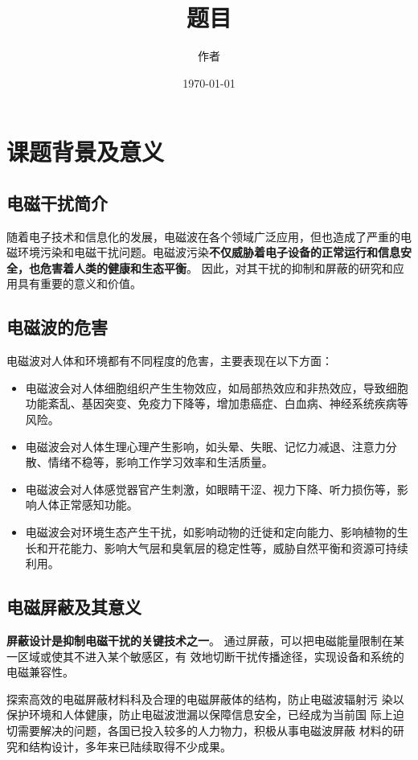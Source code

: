 \documentclass{article}
\title{题目}
\author{作者}
\date{\today}
\begin{document}
\maketitle
\newpage

\renewcommand{\baselinestretch}{1.35}
\tableofcontents
\newpage

\setlength{\parskip}{0em}
\renewcommand{\baselinestretch}{1.53}


\section{课题背景及意义}

\subsection{电磁干扰简介}
随着电子技术和信息化的发展，电磁波在各个领域广泛应用，但也造成了严重的电磁环境污染和电磁干扰问题。电磁波污染\textbf{不仅威胁着电子设备的正常运行和信息安全，也危害着人类的健康和生态平衡}。
因此，对其干扰的抑制和屏蔽的研究和应用具有重要的意义和价值。
\subsection{电磁波的危害}
电磁波对人体和环境都有不同程度的危害，主要表现在以下方面：
\begin{itemize}
\item 电磁波会对人体细胞组织产生生物效应，如局部热效应和非热效应，导致细胞功能紊乱、基因突变、免疫力下降等，增加患癌症、白血病、神经系统疾病等风险。
\item 电磁波会对人体生理心理产生影响，如头晕、失眠、记忆力减退、注意力分散、情绪不稳等，影响工作学习效率和生活质量。
\item 电磁波会对人体感觉器官产生刺激，如眼睛干涩、视力下降、听力损伤等，影响人体正常感知功能。
\item 电磁波会对环境生态产生干扰，如影响动物的迁徙和定向能力、影响植物的生长和开花能力、影响大气层和臭氧层的稳定性等，威胁自然平衡和资源可持续利用。
\end{itemize}
\subsection{电磁屏蔽及其意义}
\textbf{屏蔽设计是抑制电磁干扰的关键技术之一}。
通过屏蔽，可以把电磁能量限制在某一区域或使其不进入某个敏感区，有
效地切断干扰传播途径，实现设备和系统的电磁兼容性。

探索高效的电磁屏蔽材料科及合理的电磁屏蔽体的结构，防止电磁波辐射污
染以保护环境和人体健康，防止电磁波泄漏以保障信息安全，已经成为当前国
际上迫切需要解决的问题，各国已投入较多的人力物力，积极从事电磁波屏蔽
材料的研究和结构设计，多年来已陆续取得不少成果。
\end{document}
